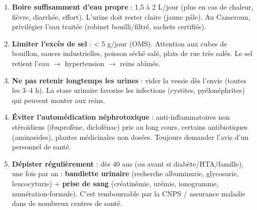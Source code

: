 \documentclass[11pt]{article}
\begin{document}
\begin{methode}
\begin{enumerate}
    \item \textbf{Boire suffisamment d'eau propre} : 1,5 à 2 L/jour (plus en cas de chaleur, fièvre, diarrhée, effort). L'urine doit rester claire (jaune pâle). Au Cameroun, privilégier l'eau traitée (robinet bouilli/filtré, sachets certifiés).
    \item \textbf{Limiter l'excès de sel} : < 5 g/jour (OMS). Attention aux cubes de bouillon, sauces industrielles, poisson séché salé, plats de rue très salés. Le sel retient l'eau $\rightarrow$ hypertension $\rightarrow$ reins abîmés.
    \item \textbf{Ne pas retenir longtemps les urines} : vider la vessie dès l'envie (toutes les 3--4 h). La stase urinaire favorise les infections (cystites, pyélonéphrites) qui peuvent monter aux reins.
    \item \textbf{Éviter l'automédication néphrotoxique} : anti-inflammatoires non stéroïdiens (ibuprofène, diclofénac) pris au long cours, certains antibiotiques (aminosides), plantes médicinales non dosées. Toujours demander l'avis d'un personnel de santé.
    \item \textbf{Dépister régulièrement} : dès 40 ans (ou avant si diabète/HTA/famille), une fois par an : \textbf{bandlette urinaire} (recherche albuminurie, glycosurie, leucocyturie) + \textbf{prise de sang} (créatinémie, urémie, ionogramme, numération-formule). C'est remboursable par la CNPS / assurance maladie dans de nombreux centres de santé.
\end{enumerate}
\end{methode}
\end{document}
